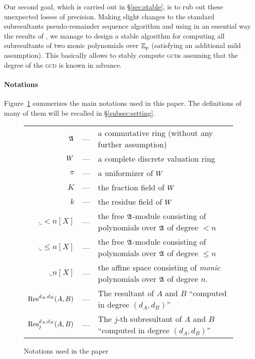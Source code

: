 \documentclass{article}
\begin{document}
Our second goal, which is carried out in \S \ref{sec:stable}, is to rub 
out these unexpected losses of precision. Making slight changes to the 
standard subresultants pseudo-remainder sequence algorithm and using in 
an essential way the results of \cite{padicprec}, we manage to design a stable 
algorithm for computing all subresultants of two monic polynomials over 
$\mathbb Z_p$ (satisfying an additional mild assumption). This basically allows 
to stably compute \textsc{gcd}s assuming that the degree of the 
\textsc{gcd} is known in advance.

\paragraph{Notations}

Figure~\ref{fig:notations} summerizes the main notations used in
this paper. The definitions of many of them will be recalled in 
\S \ref{subsec:setting}.

\begin{figure}
\begin{center}
\begin{tabular}{rcl}
$\mathfrak A$ &--- & a commutative ring (without any further assumption) \\
$W$ &---& a complete discrete valuation ring \\
$\pi$ &---& a uniformizer of $W$ \\
$K$ &---& the fraction field of $W$ \\
$k$ &---& the residue field of $W$ \smallskip \\

$\ring_{<n}[X]$ &---& the free $\mathfrak A$-module consisting of
polynomials over $\mathfrak A$ of degree $<n$ \\
$\ring_{\leq n}[X]$ &---& the free $\mathfrak A$-module consisting of
polynomials over $\mathfrak A$ of degree $\leq n$ \\
$\ring_n[X]$ &---& the affine space consisting of \emph{monic}
polynomials over $\mathfrak A$ of degree $n$. \smallskip \\

$\text{\rm Res}^{d_A,d_B}(A,B)$ &---& The resultant of $A$ and
$B$ ``computed in degree $(d_A,d_B)$'' \\
$\text{\rm Res}_j^{d_A,d_B}(A,B)$ &---& The $j$-th subresultant of $A$ and
$B$ ``computed in degree $(d_A,d_B)$'' \\
\end{tabular}
\end{center}

\vspace{-0.2cm}

\caption{Notations used in the paper}
\label{fig:notations}
\end{figure}
\end{document}
